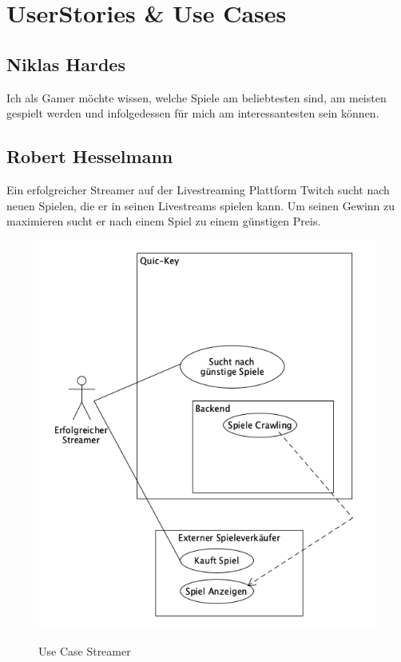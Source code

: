 \section{UserStories \& Use Cases}


\subsection*{Niklas Hardes}

Ich als Gamer möchte wissen, welche Spiele am beliebtesten sind, am meisten gespielt werden und infolgedessen für mich am interessantesten sein können.

\subsection*{Robert Hesselmann}

Ein erfolgreicher Streamer auf der Livestreaming Plattform Twitch sucht nach neuen Spielen, die er in seinen Livestreams spielen kann. Um seinen Gewinn zu maximieren sucht er nach einem Spiel zu einem günstigen Preis.

\begin{figure}[hbt]
    \begin{minipage}[t]{.7\textwidth} %
        \caption{Use Case Streamer} %
        \includegraphics[width=1\textwidth]{img/use_case_streamer.png}\\ %
    \end{minipage}
\end{figure}
    

